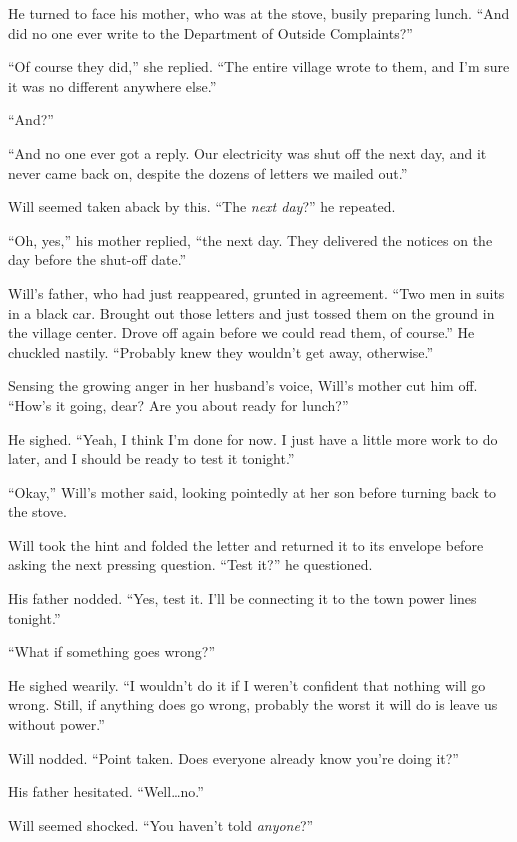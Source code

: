 \documentclass[12pt,letterpaper,oneside,english]{book}
\begin{document}
He turned to face his mother, who was at the stove, busily preparing
lunch. ``And did no one ever write to the Department of Outside
Complaints?''

``Of course they did,'' she replied. ``The entire village wrote to them,
and I'm sure it was no different anywhere else.''

``And?''

``And no one ever got a reply. Our electricity was shut off the next
day, and it never came back on, despite the dozens of letters we mailed
out.''

Will seemed taken aback by this. ``The \emph{next day}?'' he repeated.

``Oh, yes,'' his mother replied, ``the next day. They delivered the
notices on the day before the shut-off date.''

Will's father, who had just reappeared, grunted in agreement.
``Two men in suits in a black car. Brought out those letters and just
tossed them on the ground in the village center. Drove off again before
we could read them, of course.'' He chuckled nastily. ``Probably knew
they wouldn't get away, otherwise.''

Sensing the growing anger in her husband's voice, Will's mother cut him
off. ``How's it going, dear? Are you about ready for lunch?''

He sighed. ``Yeah, I think I'm done for now. I just have a little more
work to do later, and I should be ready to test it tonight.''

``Okay,'' Will's mother said, looking pointedly at her son before
turning back to the stove.

Will took the hint and folded the letter and returned it to its
envelope before asking the next pressing question. ``Test it?'' he
questioned.

His father nodded. ``Yes, test it. I'll be connecting it to the town
power lines tonight.''

``What if something goes wrong?''

He sighed wearily. ``I wouldn't do it if I weren't confident that
nothing will go wrong. Still, if anything does go wrong, probably the
worst it will do is leave us without power.''

Will nodded. ``Point taken. Does everyone already know you're doing it?''

His father hesitated. ``Well\ldots{}no.''

Will seemed shocked. ``You haven't told \emph{anyone}?''
\end{document}
